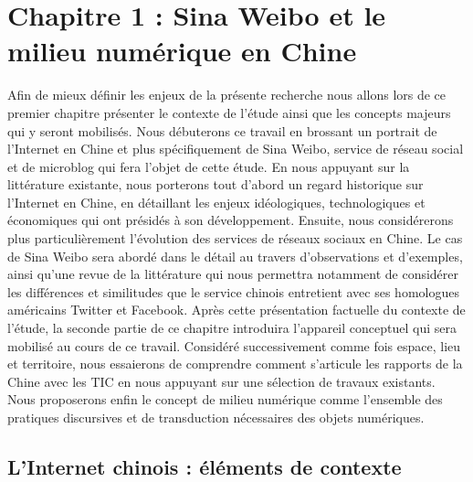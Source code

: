 \section[Chapitre 1 : Sina Weibo et le milieu num\'erique en Chine]{Chapitre 1 : Sina Weibo et le milieu num\'erique en
Chine}
Afin de mieux définir les enjeux de la présente recherche nous allons lors de ce premier chapitre présenter le contexte de l’étude ainsi que les concepts majeurs qui y seront mobilisés. Nous débuterons ce travail en brossant un portrait de l’Internet en Chine et plus spécifiquement de Sina Weibo, service de réseau social et de microblog qui fera l’objet de cette étude. En nous appuyant sur la littérature existante, nous porterons tout d’abord un regard historique sur l’Internet en Chine, en détaillant les enjeux idéologiques, technologiques et économiques qui ont présidés à son développement. Ensuite, nous considérerons plus particulièrement l’évolution des services de réseaux sociaux en Chine. Le cas de Sina Weibo sera abordé dans le détail au travers d’observations et d’exemples, ainsi qu’une revue de la littérature qui nous permettra notamment de considérer les différences et similitudes que le service chinois entretient avec ses homologues américains Twitter et Facebook. Après cette présentation factuelle du contexte de l’étude, la seconde partie de ce chapitre introduira l’appareil conceptuel qui sera mobilisé au cours de ce travail. Considéré successivement comme fois espace, lieu et territoire, nous essaierons de comprendre comment s’articule les rapports de la Chine avec les TIC en nous appuyant sur une sélection de travaux existants. Nous proposerons enfin le concept de milieu numérique comme l’ensemble des pratiques discursives et de transduction nécessaires des objets numériques.

\subsection[L’Internet chinois : éléments de contexte  ]{L’Internet chinois : éléments de contexte}

